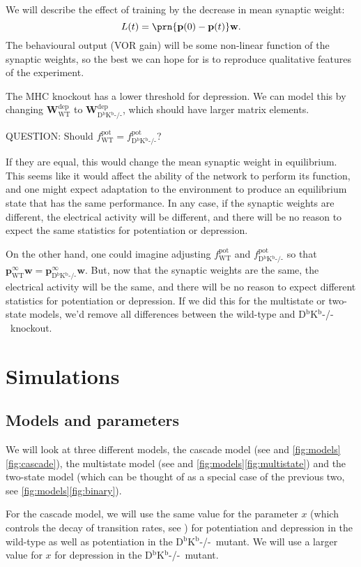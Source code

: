 \documentclass[12pt]{article}
\newcommand{\pr}{\mathbf{p}}
\newcommand{\eq}{\pr^\infty}
\newcommand{\w}{\mathbf{w}}
\newcommand{\W}{\mathbf{W}}
\newcommand{\pot}{^{\text{pot}}}
\newcommand{\dep}{^{\text{dep}}}
\newcommand{\wt}{_{\text{WT}}}
\newcommand{\ko}{_{\text{D$^\mathrm{b}$K$^\mathrm{b}$-/-}}}
\newcommand{\KO}{D$^\mathrm{b}$K$^\mathrm{b}$-/-}
\begin{document}
We will describe the effect of training by the decrease in mean synaptic weight:
%
\begin{equation}\label{eq:learning}
  L(t) = \prn{\pr(0)-\pr(t)}\w.
\end{equation}
%
The behavioural output (VOR gain) will be some non-linear function of the synaptic weights, so the best we can hope for is to reproduce qualitative features of the experiment.

The MHC knockout has a lower threshold for depression.
We can model this by changing $\W\dep\wt$ to $\W\dep\ko$, which should have larger matrix elements.

QUESTION: Should $f\pot\wt=f\pot\ko$?

If they are equal, this would change the mean synaptic weight in equilibrium.
This seems like it would affect the ability of the network to perform its function, and one might expect adaptation to the environment to produce an equilibrium state that has the same performance.
In any case, if the synaptic weights are different, the electrical activity will be different, and there will be no reason to expect the same statistics for potentiation or depression.

On the other hand, one could imagine adjusting $f\pot\wt$ and $f\pot\ko$ so that $\eq\wt\w = \eq\ko\w$.
But, now that the synaptic weights are the same, the electrical activity will be the same, and there will be no reason to expect different statistics for potentiation or depression.
If we did this for the multistate or two-state models, we'd remove all differences between the wild-type and \KO\ knockout.


\section{Simulations}\label{sec:sims}

\subsection{Models and parameters}

We will look at three different models, the cascade model (see \cite{Fusi2005cascade} and \autoref{fig:models}\ref{fig:cascade}), the multistate model (see \cite{amit1994learning,Fusi2007multistate} and \autoref{fig:models}\ref{fig:multistate}) and the two-state model (which can be thought of as a special case of the previous two, see \autoref{fig:models}\ref{fig:binary}).

For the cascade model, we will use the same value for the parameter $x$ (which controls the decay of transition rates, see \cite{Fusi2005cascade}) for potentiation and depression in the wild-type as well as potentiation in the \KO\ mutant.
We will use a larger value for $x$ for depression in the \KO\ mutant.
\end{document}
